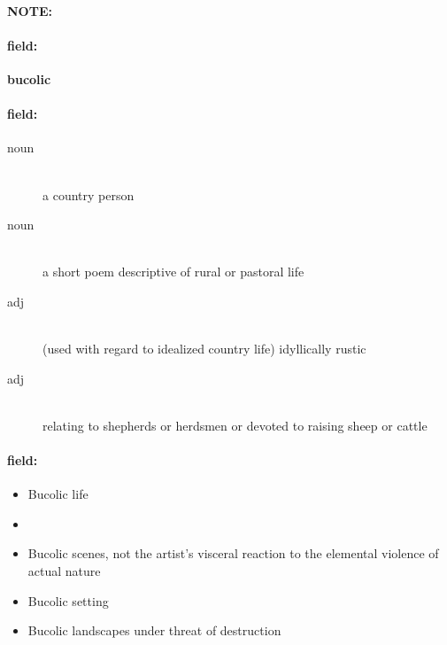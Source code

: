 \documentclass[12pt]{article}
\newenvironment{note}{\paragraph{NOTE:}}{}
\newenvironment{field}{\paragraph{field:}}{}
\begin{document}
\begin{note}
\begin{field}
\textbf{\large bucolic}
\end{field}


\begin{field}
\begin{description}
\item[noun] \hfill \\ 
a country person

\item[noun] \hfill \\ 
a short poem descriptive of rural or pastoral life

\item[adj] \hfill \\ 
(used with regard to idealized country life) idyllically rustic

\item[adj] \hfill \\ 
relating to shepherds or herdsmen or devoted to raising sheep or cattle

\end{description}
\end{field}

\begin{field}
\begin{itemize}
\item Bucolic life
\item 
\item Bucolic scenes, not the artist's visceral reaction to the elemental violence of actual nature
\item Bucolic setting
\item Bucolic landscapes under threat of destruction
\end{itemize}
\end{field}
\end{note}
\end{document}

